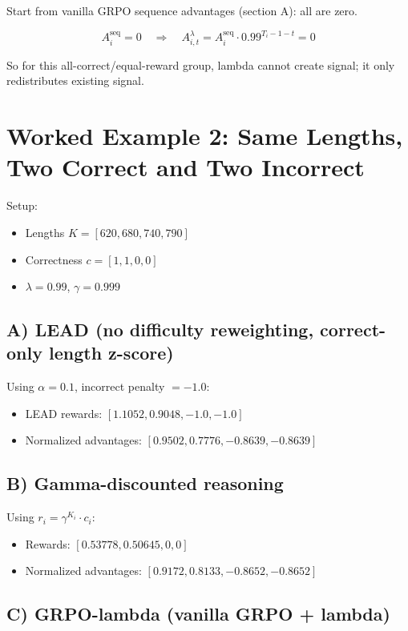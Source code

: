 \documentclass[11pt]{article}
\begin{document}
Start from vanilla GRPO sequence advantages (section A): all are zero.

\begin{equation}
A_i^{\mathrm{seq}}=0 \quad\Rightarrow\quad A_{i,t}^{\lambda}=A_i^{\mathrm{seq}}\cdot 0.99^{T_i-1-t}=0
\end{equation}

So for this all-correct/equal-reward group, lambda cannot create signal; it only redistributes existing signal.

\section{Worked Example 2: Same Lengths, Two Correct and Two Incorrect}

Setup:

\begin{itemize}
\item Lengths $K=[620,680,740,790]$
\item Correctness $c=[1,1,0,0]$
\item $\lambda=0.99$, $\gamma=0.999$
\end{itemize}

\subsection*{A) LEAD (no difficulty reweighting, correct-only length z-score)}

Using $\alpha=0.1$, incorrect penalty $=-1.0$:

\begin{itemize}
\item LEAD rewards: $[1.1052,0.9048,-1.0,-1.0]$
\item Normalized advantages: $[0.9502,0.7776,-0.8639,-0.8639]$
\end{itemize}

\subsection*{B) Gamma-discounted reasoning}

Using $r_i=\gamma^{K_i}\cdot c_i$:

\begin{itemize}
\item Rewards: $[0.53778,0.50645,0,0]$
\item Normalized advantages: $[0.9172,0.8133,-0.8652,-0.8652]$
\end{itemize}

\subsection*{C) GRPO-lambda (vanilla GRPO + lambda)}
\end{document}
